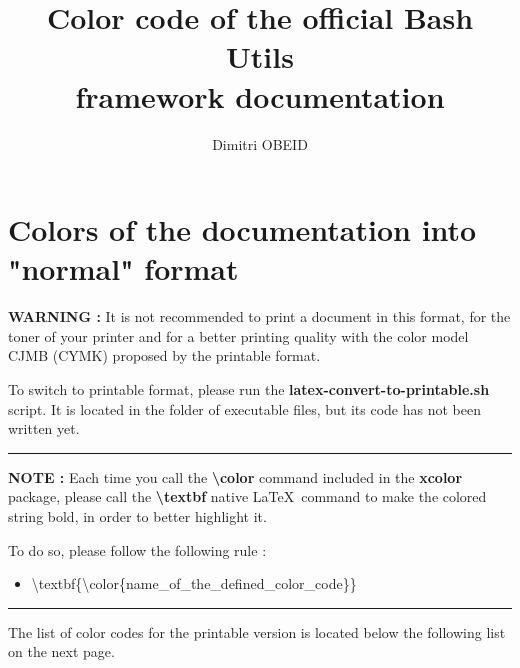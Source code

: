 \documentclass[a4paper,10pt]{article}
\title{\color{sec1}Color code of the official Bash Utils \\framework documentation}\color{text}
\author{Dimitri OBEID}
\begin{document}
\maketitle
\newpage

\color{sec1}
\section{Colors of the documentation into "normal" format}\color{text}

\begin{justify}
  \textbf{\color{case}WARNING :} It is not recommended to print a document in this format, for the toner of your printer and for a better printing quality with the color model CJMB (CYMK) proposed by the printable format.

  To switch to printable format, please run the \textbf{\color{cmds}latex-convert-to-printable.sh} script. It is located in the folder of executable files, but its code has not been written yet.
\end{justify}

\color{text}\par\noindent\rule{\textwidth}{0.4pt}\color{text}

\begin{justify}
  \textbf{NOTE :} Each time you call the \textbf{\textbackslash{color}} command included in the \textbf{xcolor} package, please call the \textbf{\textbackslash{textbf}} native \LaTeX \ command to make the colored string bold, in order to better highlight it.
\end{justify}

\begin{justify}
  To do so, please follow the following rule :

  \begin{itemize}
    \item \textbackslash{textbf\{\textbackslash{color\{name\_of\_the\_defined\_color\_code}\}}\}
  \end{itemize}
\end{justify}

\color{text}\par\noindent\rule{\textwidth}{0.4pt}\color{text}

\begin{justify}
  The list of color codes for the printable version is located below the following list on the next page.
\end{justify}
\end{document}
